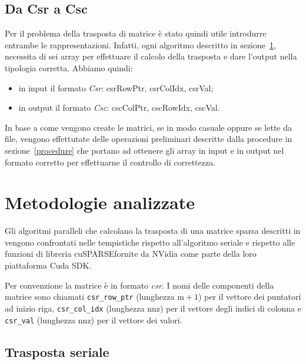 \documentclass[]{IEEEtran}
\newcommand{\cuSPARSE}{\textrm{cuSPARSE}}
\newcommand{\var}[1]{\texttt{#1}}
\begin{document}
	\subsection{Da Csr a Csc}
	\label{csr-to-csc}
 	Per il problema della trasposta di matrice è stato quindi utile introdurre entrambe le rappresentazioni. Infatti, ogni algoritmo  descritto in sezione~\ref{metodologie}, necessita di sei array per effettuare il calcolo della trasposta e dare l'output nella tipologia corretta. Abbiamo quindi:
 	\begin{itemize}
 		\item in input il formato \textit{Csr}: csrRowPtr, csrColIdx, csrVal;
 		\item in output il formato \textit{Csc}: cscColPtr, cscRowIdx, cscVal.	
 	\end{itemize}
 	In base a come vengono create le matrici, se in modo casuale oppure se lette da file, vengono effettutate delle operazioni preliminari descritte dalla procedure in sezione~\ref{procedure} che portano ad ottenere gli array in input e in output nel formato corretto per effettuarne il controllo di correttezza.\newline

\section{Metodologie analizzate}\label{metodologie}

Gli algoritmi paralleli che calcolano la trasposta di una matrice sparsa descritti in \cite{parallelTrans} vengono confrontati nelle tempistiche rispetto all'algoritmo seriale e rispetto alle funzioni di libreria \cuSPARSE fornite da NVidia come parte della loro piattaforma Cuda SDK. 

Per convenzione la matrice è in formato \emph{csr}. I nomi delle componenti della matrice sono chiamati \var{csr\_row\_ptr} (lunghezza $\mathrm{m}+1$) per il vettore dei puntatori ad inizio riga, \var{csr\_col\_idx} (lunghezza $\mathrm{nnz}$) per il vettore degli indici di colonna e \var{csr\_val} (lunghezza $\mathrm{nnz}$) per il vettore dei valori. 
		
\subsection{Trasposta seriale}
\end{document}
